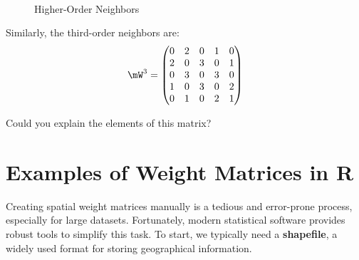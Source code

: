 \begin{figure}[ht]
\caption{Higher-Order Neighbors}
\label{fig:example_hon}
\centering
{}
\\
\vspace{1cm}
\end{figure}

Similarly, the third-order neighbors are: 
\begin{equation*}
\mW^3 = \begin{pmatrix}
      0 & 2 & 0 & 1 & 0 \\
      2 & 0 & 3 & 0 & 1 \\
      0 & 3 & 0 & 3 & 0 \\
      1 & 0 & 3 & 0 & 2 \\
      0 & 1 & 0 & 2 & 1
      \end{pmatrix}
\end{equation*}

Could you explain the elements of this matrix?

\section{Examples of Weight Matrices in R}

Creating spatial weight matrices manually is a tedious and error-prone process, especially for large datasets. Fortunately, modern statistical software provides robust tools to simplify this task. To start, we typically need a \textbf{shapefile}, a widely used format for storing geographical information.

